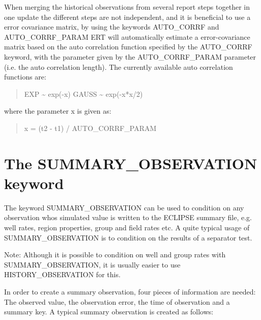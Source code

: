 \documentclass[a4paper,10pt,english]{sphinxmanual}
\begin{document}
When merging the historical observations from several report steps
together in one update the different steps are not independent, and it
is beneficial to use a error covariance matrix, by using the keywords
AUTO\_CORRF and AUTO\_CORRF\_PARAM ERT will automatically estimate a
error-covariance matrix based on the auto correlation function
specified by the AUTO\_CORRF keyword, with the parameter given by the
AUTO\_CORRF\_PARAM parameter (i.e. the auto correlation length). The
currently available auto correlation functions are:
\begin{quote}

EXP   \textasciitilde{} exp(-x)
GAUSS \textasciitilde{} exp(-x*x/2)
\end{quote}

where the parameter x is given as:
\begin{quote}

x = (t2 - t1) / AUTO\_CORRF\_PARAM
\end{quote}


\section{The SUMMARY\_OBSERVATION keyword}
\label{\detokenize{observations/index:the-summary-observation-keyword}}
The keyword SUMMARY\_OBSERVATION can be used to condition on any
observation whos simulated value is written to the ECLIPSE summary
file, e.g. well rates, region properties, group and field rates etc. A
quite typical usage of SUMMARY\_OBSERVATION is to condition on the
results of a separator test.

Note: Although it is possible to condition on well and group rates
with SUMMARY\_OBSERVATION, it is usually easier to use
HISTORY\_OBSERVATION for this.

In order to create a summary observation, four pieces of information
are needed: The observed value, the observation error, the time of
observation and a summary key. A typical summary observation is
created as follows:

%
\begin{sphinxVerbatim}[commandchars=\\\{\}]
 
     
       
      
       
\end{sphinxVerbatim}
\end{document}
